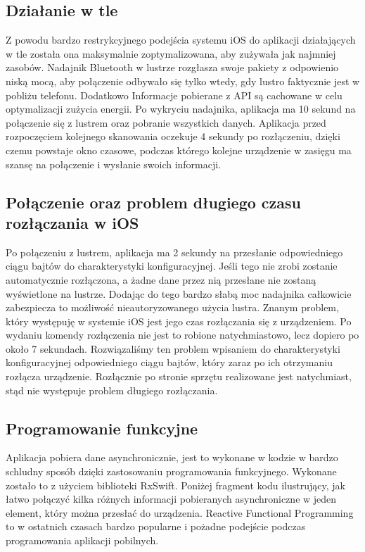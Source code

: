 \documentclass[a4paper,11pt]{article}
\begin{document}
\subsection{Działanie w tle}
Z powodu bardzo restrykcyjnego podejścia systemu iOS do aplikacji działających w tle została ona maksymalnie zoptymalizowana, aby zużywała jak najmniej zasobów. Nadajnik Bluetooth w lustrze rozgłasza swoje pakiety z odpowienio niską mocą, aby połączenie odbywało się tylko wtedy, gdy lustro faktycznie jest w pobliżu telefonu. Dodatkowo Informacje pobierane z API są cachowane w celu optymalizacji zużycia energii. Po wykryciu nadajnika, aplikacja ma 10 sekund na połączenie się z lustrem oraz pobranie wszystkich danych. Aplikacja przed rozpoczęciem kolejnego skanowania oczekuje 4 sekundy po rozłączeniu, dzięki czemu powstaje okno czasowe, podczas którego kolejne urządzenie w zasięgu ma szansę na połączenie i wysłanie swoich informacji.

\subsection{Połączenie oraz problem długiego czasu rozłączania w iOS}
Po połączeniu z lustrem, aplikacja ma 2 sekundy na przesłanie odpowiedniego ciągu bajtów do charakterystyki konfiguracyjnej. Jeśli tego nie zrobi zostanie automatycznie rozłączona, a żadne dane przez nią przesłane nie zostaną wyświetlone na lustrze. Dodając do tego bardzo słabą moc nadajnika całkowicie zabezpiecza to możliwość nieautoryzowanego użycia lustra. Znanym problem, który występuję w systemie iOS jest jego czas rozłączania się z urządzeniem. Po wydaniu komendy rozłączenia nie jest to robione natychmiastowo, lecz dopiero po około 7 sekundach. Rozwiązaliśmy ten problem wpisaniem do charakterystyki konfiguracyjnej odpowiedniego ciągu bajtów, który zaraz po ich otrzymaniu rozłącza urządzenie. Rozłącznie po stronie sprzętu realizowane jest natychmiast, stąd nie występuje problem długiego rozłączania.

\subsection{Programowanie funkcyjne}
Aplikacja pobiera dane asynchronicznie, jest to wykonane w kodzie w bardzo schludny sposób dzięki zastosowaniu programowania funkcyjnego. Wykonane zostało to z użyciem biblioteki RxSwift. Poniżej fragment kodu ilustrujący, jak łatwo połączyć kilka różnych informacji pobieranych asynchroniczne w jeden element, który można przesłać do urządzenia. Reactive Functional Programming to w ostatnich czasach bardzo popularne i pożadne podejście podczas programowania aplikacji pobilnych.
\end{document}
